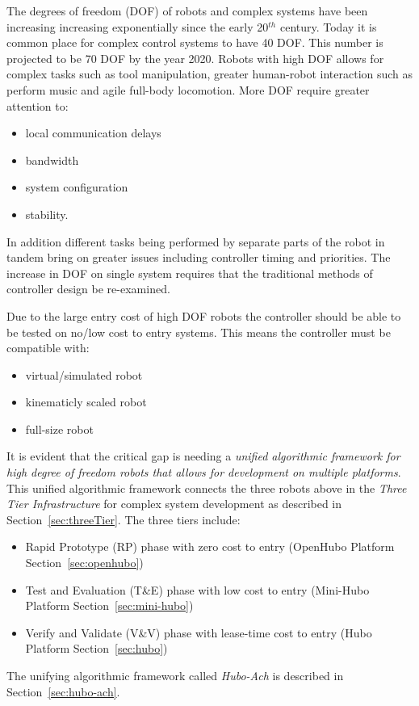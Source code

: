 The degrees of freedom (DOF) of robots and complex systems have been increasing increasing exponentially since the early 20$^{th}$ century.
Today it is common place for complex control systems to have 40 DOF. 
This number is projected to be 70 DOF by the year 2020.
Robots with high DOF allows for complex tasks such as tool manipulation\cite{lofaroRAM2013,lofaroTePRA2013HuboAch,lofaroTePRA2013Valve,gtechIK}, greater human-robot interaction such as perform music\cite{lofaroEURASIP2011, 6094987,lofaroIASTED2011,5686847} and agile full-body locomotion\cite{lofaroHumanoids2012,lofaroGamesRobot,tepraLadder2013}.
More DOF require greater attention to:
\begin{itemize}
\item local communication delays
\item bandwidth
\item system configuration
\item stability.
\end{itemize}
In addition different tasks being performed by separate parts of the robot in tandem bring on greater issues including controller timing and priorities.
The increase in DOF on single system requires that the traditional methods of controller design be re-examined.

Due to the large entry cost of high DOF robots the controller should be able to be tested on no/low cost to entry systems.
This means the controller must be compatible with:
\begin{itemize}
\item virtual/simulated robot
\item kinematicly scaled robot
\item full-size robot
\end{itemize}

It is evident that the critical gap is needing a \textit{unified algorithmic framework for high degree of freedom robots that allows for development on multiple platforms}.
This unified algorithmic framework connects the three robots above in the \textit{Three Tier Infrastructure}\cite{threeTier} for complex system development as described in Section~\ref{sec:threeTier}.
The three tiers include:
\begin{itemize}
\item Rapid Prototype (RP) phase with zero cost to entry (OpenHubo Platform Section~\ref{sec:openhubo})
\item Test and Evaluation (T\&E) phase with low cost to entry (Mini-Hubo Platform Section~\ref{sec:mini-hubo})
\item Verify and Validate (V\&V) phase with lease-time cost to entry (Hubo Platform Section~\ref{sec:hubo})
\end{itemize}
The unifying algorithmic framework called \textit{Hubo-Ach}\cite{lofaroRAM2013} is described in Section~\ref{sec:hubo-ach}.


